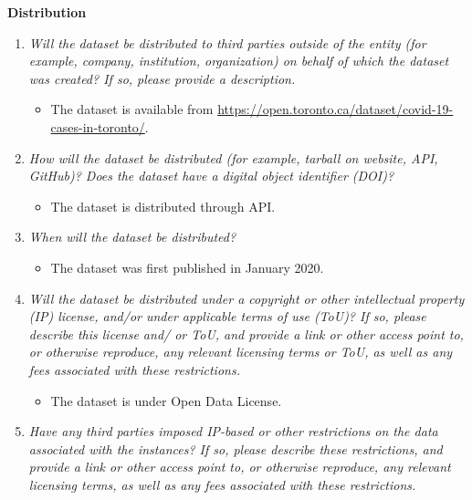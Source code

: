 \documentclass[
]{article}
\providecommand{\tightlist}{%
  \setlength{\itemsep}{0pt}\setlength{\parskip}{0pt}}
\begin{document}
\textbf{Distribution}

\begin{enumerate}
\def\labelenumi{\arabic{enumi}.}
\tightlist
\item
  \emph{Will the dataset be distributed to third parties outside of the entity (for example, company, institution, organization) on behalf of which the dataset was created? If so, please provide a description.}

  \begin{itemize}
  \tightlist
  \item
    The dataset is available from \url{https://open.toronto.ca/dataset/covid-19-cases-in-toronto/}.\\
  \end{itemize}
\item
  \emph{How will the dataset be distributed (for example, tarball on website, API, GitHub)? Does the dataset have a digital object identifier (DOI)?}

  \begin{itemize}
  \tightlist
  \item
    The dataset is distributed through API.
  \end{itemize}
\item
  \emph{When will the dataset be distributed?}

  \begin{itemize}
  \tightlist
  \item
    The dataset was first published in January 2020.
  \end{itemize}
\item
  \emph{Will the dataset be distributed under a copyright or other intellectual property (IP) license, and/or under applicable terms of use (ToU)? If so, please describe this license and/ or ToU, and provide a link or other access point to, or otherwise reproduce, any relevant licensing terms or ToU, as well as any fees associated with these restrictions.}

  \begin{itemize}
  \tightlist
  \item
    The dataset is under Open Data License.
  \end{itemize}
\item
  \emph{Have any third parties imposed IP-based or other restrictions on the data associated with the instances? If so, please describe these restrictions, and provide a link or other access point to, or otherwise reproduce, any relevant licensing terms, as well as any fees associated with these restrictions.}


\end{enumerate}
\end{document}

